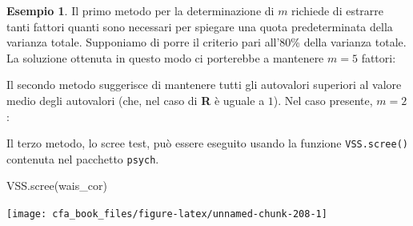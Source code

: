 \documentclass[
  11pt,
]{krantz}
\makeatletter
\newenvironment{Shaded}{\begin{snugshade}}{\end{snugshade}}
\newcommand{\CommentTok}[1]{\textcolor[rgb]{0.37,0.37,0.37}{\textit{#1}}}
\newcommand{\DecValTok}[1]{\textcolor[rgb]{0.06,0.06,0.06}{#1}}
\newcommand{\FunctionTok}[1]{\textcolor[rgb]{0,0,0}{#1}}
\newcommand{\NormalTok}[1]{#1}
\newcommand{\OtherTok}[1]{\textcolor[rgb]{0.37,0.37,0.37}{#1}}
\newcommand{\SpecialCharTok}[1]{\textcolor[rgb]{0,0,0}{#1}}
\newenvironment{kframe}{%
\medskip{}
\setlength{\fboxsep}{.8em}
 \def\at@end@of@kframe{}%
 \ifinner\ifhmode%
  \def\at@end@of@kframe{\end{minipage}}%
  \begin{minipage}{\columnwidth}%
 \fi\fi%
 \def\FrameCommand##1{\hskip\@totalleftmargin \hskip-\fboxsep
 \colorbox{shadecolor}{##1}\hskip-\fboxsep
     \hskip-\linewidth \hskip-\@totalleftmargin \hskip\columnwidth}%
 \MakeFramed {\advance\hsize-\width
   \@totalleftmargin\z@ \linewidth\hsize
   \@setminipage}}%
 {\par\unskip\endMakeFramed%
 \at@end@of@kframe}
\renewenvironment{Shaded}{\begin{kframe}}{\end{kframe}}
\theoremstyle{definition}
\theoremstyle{definition}
\newtheorem{example}{Esempio}[chapter]
\theoremstyle{definition}
\theoremstyle{definition}
\theoremstyle{remark}
\makeatother
\begin{document}
\begin{example}
Il primo metodo per la determinazione di \(m\) richiede di estrarre tanti fattori quanti sono necessari per spiegare una quota predeterminata della varianza totale. Supponiamo di porre il criterio pari all'80\% della varianza totale. La soluzione ottenuta in questo modo ci porterebbe a mantenere \(m=5\) fattori:

\begin{Shaded}
\end{Shaded}

Il secondo metodo suggerisce di mantenere tutti gli autovalori superiori al valore medio degli autovalori (che, nel caso di \textbf{R} è uguale a \(1\)). Nel caso presente, \(m=2\):

\begin{Shaded}
\end{Shaded}

Il terzo metodo, lo scree test, può essere eseguito usando la funzione \texttt{VSS.scree()} contenuta nel pacchetto \texttt{psych}.

\begin{Shaded}
\begin{Highlighting}[]
\FunctionTok{VSS.scree}\NormalTok{(wais\_cor)}
\end{Highlighting}
\end{Shaded}

\begin{center}\texttt{[image: cfa\_book\_files/figure-latex/unnamed-chunk-208-1]} \end{center}


\end{example}
\end{document}

